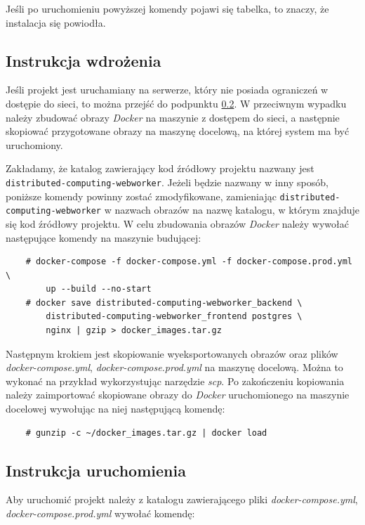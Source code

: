 \documentclass[a4paper,11pt,twoside]{report}
\theoremstyle{definition}
\begin{document}
        Jeśli po uruchomieniu powyższej komendy pojawi się tabelka, to znaczy, że instalacja się powiodła.

    \subsection{Instrukcja wdrożenia}
    
        Jeśli projekt jest uruchamiany na serwerze, który nie posiada ograniczeń w dostępie do sieci, to można przejść do podpunktu \ref{start-system}. W przeciwnym wypadku należy zbudować obrazy \textit{Docker} na maszynie z dostępem do sieci, a następnie skopiować przygotowane obrazy na maszynę docelową, na której system ma być uruchomiony.
        
        Zakładamy, że katalog zawierający kod źródłowy projektu nazwany jest \texttt{distributed-computing-webworker}. Jeżeli będzie nazwany w inny sposób, poniższe komendy powinny zostać zmodyfikowane, zamieniając \texttt{distributed-computing-webworker} w nazwach obrazów na nazwę katalogu, w którym znajduje się kod źródłowy projektu. 
        W celu zbudowania obrazów \textit{Docker} należy wywołać następujące komendy na maszynie budującej:

        \begin{verbatim}
    # docker-compose -f docker-compose.yml -f docker-compose.prod.yml \
        up --build --no-start
    # docker save distributed-computing-webworker_backend \
        distributed-computing-webworker_frontend postgres \
        nginx | gzip > docker_images.tar.gz    
        \end{verbatim}

        Następnym krokiem jest skopiowanie wyeksportowanych obrazów oraz plików \textit{docker-compose.yml}, \textit{docker-compose.prod.yml} na maszynę docelową. Można to wykonać na przykład wykorzystując narzędzie \textit{scp}.
        Po zakończeniu kopiowania należy zaimportować skopiowane obrazy do \textit{Docker} uruchomionego na maszynie docelowej wywołując na niej następującą komendę:

        \begin{verbatim}
    # gunzip -c ~/docker_images.tar.gz | docker load
        \end{verbatim}

    \subsection{Instrukcja uruchomienia}
        \label{start-system}
        Aby uruchomić projekt należy z katalogu zawierającego pliki \textit{docker-compose.yml}, \textit{docker-compose.prod.yml} wywołać komendę:
\end{document}
